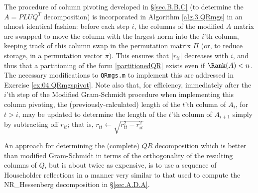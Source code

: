The procedure of column pivoting developed in \S \ref{sec.B.B.C} (to determine the $A=PLU\!Q^T$ decomposition)
is incorporated in Algorithm \ref{alg.3.QRmgs} in an almost identical fashion: before each step $i$,
the columns of the modified $A$ matrix are swapped to move the column with the largest
norm into the $i$'th column, keeping track of this column swap in the permutation matrix $\Pi$ (or, to reduce storage,
in a permutation vector $\pi$). This ensures that $|r_{ii}|$ decreases with $i$,
and thus that a partitioning of the form \eqref{partitionedQR} exists even if $\Rank(A)<n$.  The necessary modifications to {\tt QRmgs.m}
to implement this are addressed in Exercise \ref{ex:04.QRmgspivot}.  
Note also that, for efficiency, immediately after the $i$'th step of the Modified Gram-Schmidt procedure when implementing
this column pivoting, the (previously-calculated)
length of the $t$'th column of $A_{i}$, for $t> i$, may be updated to determine the length of the $t$'th
column of $A_{i+1}$ simply by subtracting off $r_{i t}$; that is, $r_{tt} \leftarrow \sqrt{r_{tt}^2 - r_{it}^2}$ 


\noindent An approach for determining the (complete) $QR$ decomposition which is
better than modified Gram-Schmidt in terms of the orthogonality of the
resulting columns of $Q$, but is about twice as expensive, is to use a
sequence of Householder reflections in a manner very similar to that
used to compute the NR_Hessenberg decomposition in \S \ref{sec.A.D.A}.

